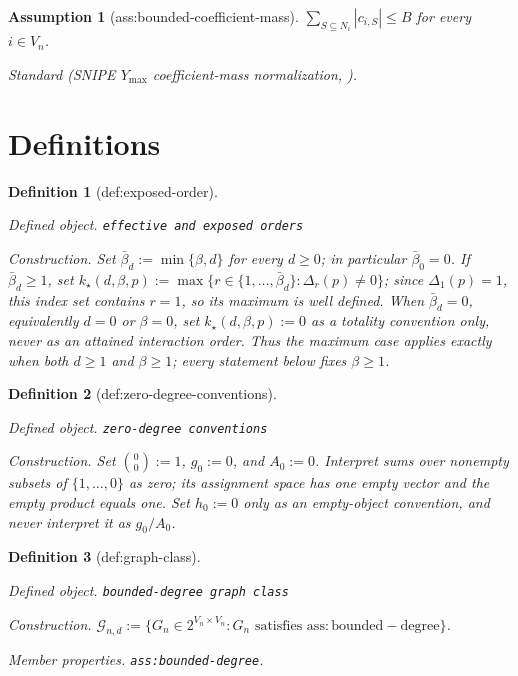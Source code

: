 \documentclass{article}
\newtheorem{assumption}{Assumption}
\newtheorem{definition}{Definition}
\begin{document}
\begin{assumption}[ass:bounded-coefficient-mass]\label{ass:bounded-coefficient-mass}
\(\sum_{S\subseteq N_i}|c_{i,S}|\le B\) for every \(i\in V_n\).
\par\smallskip\noindent\emph{Standard} (SNIPE \(Y_{\max}\) coefficient-mass normalization, \cite{CortezRodriguezEichhornYu2023}).
\end{assumption}

\section{Definitions}

\begin{definition}[def:exposed-order]\label{def:exposed-order}
\par\smallskip\noindent\emph{Defined object.} \texttt{effective and exposed orders}
\par\smallskip\noindent\emph{Construction.} Set \(\bar\beta_d:=\min\{\beta,d\}\) for every \(d\ge0\); in particular \(\bar\beta_0=0\). If \(\bar\beta_d\ge1\), set \(k_\star(d,\beta,p):=\max\{r\in\{1,\ldots,\bar\beta_d\}:\Delta_r(p)\ne0\}\); since \(\Delta_1(p)=1\), this index set contains \(r=1\), so its maximum is well defined. When \(\bar\beta_d=0\), equivalently \(d=0\) or \(\beta=0\), set \(k_\star(d,\beta,p):=0\) as a totality convention only, never as an attained interaction order. Thus the maximum case applies exactly when both \(d\ge1\) and \(\beta\ge1\); every statement below fixes \(\beta\ge1\).
\end{definition}

\begin{definition}[def:zero-degree-conventions]\label{def:zero-degree-conventions}
\par\smallskip\noindent\emph{Defined object.} \texttt{zero-\allowbreak{}degree conventions}
\par\smallskip\noindent\emph{Construction.} Set \(\binom{0}{0}:=1\), \(g_0:=0\), and \(A_0:=0\). Interpret sums over nonempty subsets of \(\{1,\ldots,0\}\) as zero; its assignment space has one empty vector and the empty product equals one. Set \(h_0:=0\) only as an empty-object convention, and never interpret it as \(g_0/A_0\).
\end{definition}

\begin{definition}[def:graph-class]\label{def:graph-class}
\par\smallskip\noindent\emph{Defined object.} \texttt{bounded-\allowbreak{}degree graph class}
\par\smallskip\noindent\emph{Construction.} \(\mathcal G_{n,d}:=\{G_n\in2^{V_n\times V_n}:G_n\text{ satisfies }\mathrm{ass:bounded-degree}\}\).
\par\smallskip\noindent\emph{Member properties.} \texttt{ass:\allowbreak{}bounded-\allowbreak{}degree}.
\end{definition}
\end{document}
